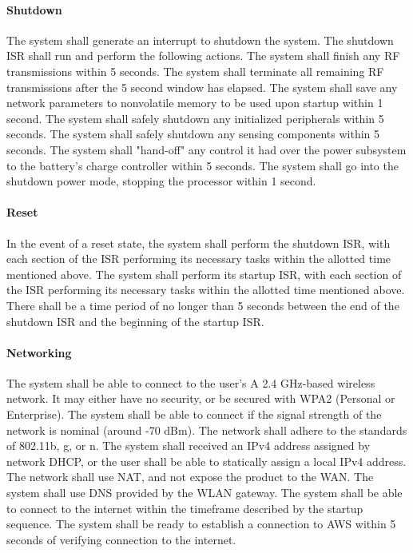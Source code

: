 \paragraph{Shutdown} The system shall generate an interrupt to shutdown the system. The shutdown ISR shall run and perform the following actions. The system shall finish any RF transmissions within 5 seconds. The system shall terminate all remaining RF transmissions after the 5 second window has elapsed. The system shall save any network parameters to nonvolatile memory to be used upon startup within 1 second. The system shall safely shutdown any initialized peripherals within 5 seconds. The system shall safely shutdown any sensing components within 5 seconds. The system shall "hand-off" any control it had over the power subsystem to the battery's charge controller within 5 seconds. The system shall go into the shutdown power mode, stopping the processor within 1 second.

\paragraph{Reset} In the event of a reset state, the system shall perform the shutdown ISR, with each section of the ISR performing its necessary tasks within the allotted time mentioned above. The system shall perform its startup ISR, with each section of the ISR performing its necessary tasks within the allotted time mentioned above. There shall be a time period of no longer than 5 seconds between the end of the shutdown ISR and the beginning of the startup ISR.

\paragraph{Networking} The system shall be able to connect to the user's A 2.4 GHz-based wireless network. It may either have no security, or be secured with WPA2 (Personal or Enterprise). The system shall be able to connect if the signal strength of the network is nominal (around -70 dBm). The network shall adhere to the standards of 802.11b, g, or n. The system shall received an IPv4 address assigned by network DHCP, or the user shall be able to statically assign a local IPv4 address. The network shall use NAT, and not expose the product to the WAN. The system shall use DNS provided by the WLAN gateway. The system shall be able to connect to the internet within the timeframe described by the startup sequence. The system shall be ready to establish a connection to AWS within 5 seconds of verifying connection to the internet.

